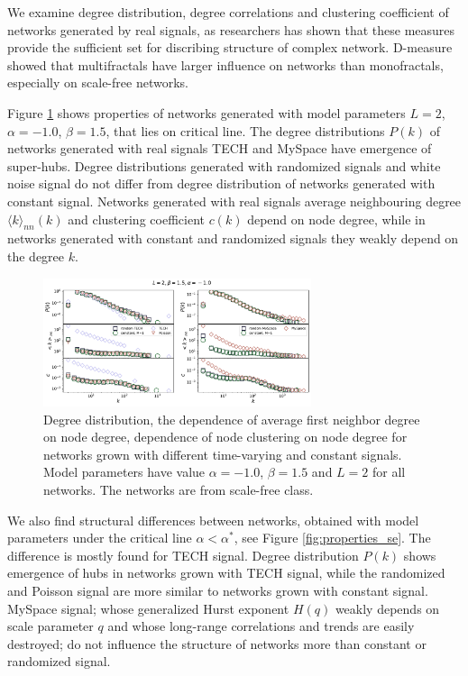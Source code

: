 We examine degree distribution, degree correlations and clustering coefficient of networks generated by real signals, as researchers has shown that these measures provide the sufficient set for discribing structure of complex network. D-measure showed that multifractals have larger influence on networks than monofractals, especially on scale-free networks. 

Figure \ref{fig:properties_sf} shows properties of networks generated with model parameters $L=2$, $\alpha=-1.0$, $\beta=1.5$, that lies on critical line.  The degree distributions $P(k)$ of networks generated with real signals TECH and MySpace have emergence of super-hubs. Degree distributions generated with randomized signals and white noise signal do not differ from degree distribution of networks generated with constant signal. Networks generated with real signals average neighbouring degree $\langle k\rangle_{nn}(k)$ and clustering coefficient $c(k)$ depend on node degree, while in networks generated with constant and randomized signals they weakly depend on the degree $k$.

\begin{figure}[h!]
	\centering
	\includegraphics[width=0.7\textwidth]{Figures/b1.pdf}
	\caption{Degree distribution, the dependence of average first neighbor degree on node degree, dependence of node clustering on node degree for networks grown with different time-varying and constant signals. Model parameters have value $\alpha=-1.0$, $\beta=1.5$  and $L=2$ for all networks. The networks are from scale-free class.}
	\label{fig:properties_sf}
\end{figure}

We also find structural differences between networks, obtained with model parameters under the critical line $\alpha<\alpha^{*}$, see Figure \ref{fig:properties_se}. The difference is mostly found for TECH signal. Degree distribution $P(k)$ shows emergence of hubs in networks grown with TECH signal, while the randomized and Poisson signal are more similar to networks grown with constant signal. MySpace signal; whose generalized Hurst exponent $H(q)$ weakly depends on scale parameter $q$ and whose long-range correlations and trends are easily destroyed; do not influence the structure of networks more than constant or randomized signal.   

